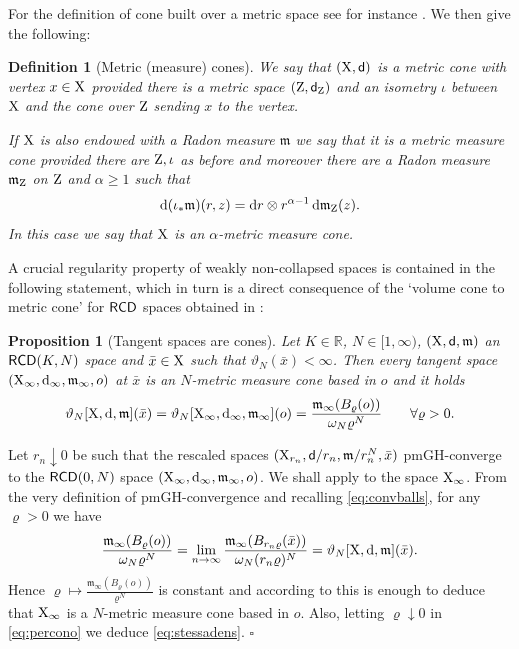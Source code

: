 \documentclass[reqno,11pt]{article}
\numberwithin{equation}{section}
\newcommand{\R}{\mathbb{R}}
\newcommand{\Z}{\mathbb{Z}}
\newcommand{\mm}{{\mbox{\boldmath$m$}}}
\newcommand{\sfd}{{\sf d}}
\renewcommand{\d}{{\mathrm d}}
\renewcommand{\mm}{\mathfrak m}                                %
\renewenvironment{proof}{\removelastskip\par\medskip   %
\noindent{\em Proof} \rm}{\penalty-20\null\hfill$\square$\par\medbreak}
\newtheorem{proposition}[theorem]{Proposition}
\newtheorem{definition}[theorem]{Definition}
\newcommand{\X}{{\rm X}}
\renewcommand{\Z}{{\rm Z}}
\newcommand{\RCD}{{\sf RCD}}
\begin{document}
For the definition of cone built over a metric space see for instance \cite[Definition 3.6.16]{BBI01}. We then give the following:
\begin{definition}[Metric (measure) cones]
We say that $(\X,\sfd)$ is a metric cone with vertex $x\in\X$ provided there is a metric space $(\Z,\sfd_\Z)$ and an isometry $\iota$ between $\X$ and the cone over $\Z$ sending $x$ to the vertex.

If $\X$ is also endowed with a Radon measure $\mm$ we say that  it is a metric measure cone provided there are $\Z,\iota$ as before and moreover there are a Radon measure $\mm_\Z$ on $\Z$ and $\alpha\ge 1$ such that 
\[
\d(\iota_*\mm)(r,z)=\d r\otimes r^{\alpha-1}\,\d\mm_\Z(z).
\]
In this case we say that $\X$ is an $\alpha$-metric measure cone.
\end{definition}
A crucial regularity property of weakly non-collapsed spaces is contained in the following statement, which in turn is a   direct  consequence of the `volume cone to metric cone' for $\RCD$ spaces obtained in \cite[Theorem 1.1]{DPG16}:
\begin{proposition}[Tangent spaces are cones]\label{le:metriccone}
Let $K\in\R$, $N\in[1,\infty)$, $(\X,\sfd,\mm)$  an $\RCD(K,N)$ space and $\bar x\in\X$ such that $\vartheta_N(\bar x)<\infty$. Then every tangent space $(\X_\infty,\d_\infty,\mm_\infty,o)$ at $\bar x$ is an $N$-metric measure cone based in $o$ and it holds
\begin{equation}
\label{eq:stessadens}
\vartheta_N[\X,\d,\mm](\bar x)=\vartheta_N[\X_\infty,\d_\infty,\mm_\infty](o)=\frac{\mm_\infty(B_\varrho(o))}{\omega_N\varrho^N}\qquad\forall\varrho>0.
\end{equation}
\end{proposition}
\begin{proof}
Let $r_n\downarrow0$ be such that the rescaled spaces $(\X_{r_n},\sfd/r_n,\mm/r_n^N,\bar x)$  pmGH-converge to the $\RCD(0,N)$ space $(\X_\infty,\d_\infty,\mm_\infty,o)$. We shall apply \cite[Theorem 1.1]{DPG16} to the space $\X_\infty$. From the very definition of pmGH-convergence and recalling \eqref{eq:convballs}, for any $\varrho>0$ we have 
\begin{equation}
\label{eq:percono}
\frac{\mm_\infty(B_\varrho(o))}{\omega_N\varrho^N}=\lim_{n\to\infty}\frac{\mm_\infty(B_{r_n\varrho}(\bar x))}{\omega_N(r_n\varrho)^N}=\vartheta_N[\X,\d,\mm](\bar x).
\end{equation}
Hence $\varrho\mapsto\frac{\mm_\infty(B_\varrho(o))}{\varrho^N}$ is constant and according to \cite[Theorem 1.1]{DPG16} this is enough to deduce that $\X_\infty$ is a $N$-metric measure cone based in $o$. Also, letting $\varrho\downarrow0$ in \eqref{eq:percono} we deduce \eqref{eq:stessadens}.
\end{proof}
\end{document}

